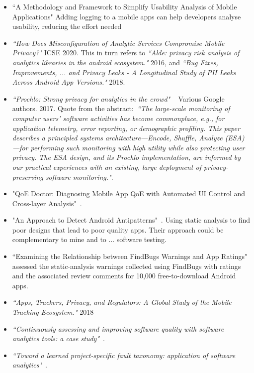 \begin{itemize}
    \item ``A Methodology and Framework to Simplify Usability Analysis of Mobile Applications" Adding logging to a mobile apps can help developers analyse usability, reducing the effort needed
    
    \item \emph{``How Does Misconfiguration of Analytic Services Compromise Mobile Privacy?"} ICSE 2020. This in turn refers to \emph{``Alde: privacy risk analysis of analytics libraries in the android ecosystem."} 2016, and \emph{``Bug Fixes, Improvements, ... and Privacy Leaks - A Longitudinal Study of PII Leaks Across Android App Versions."} 2018.
    
    \item \emph{``Prochlo: Strong privacy for analytics in the crowd"}  ~\citep{prochlo2017_strong_privacy_analytics_in_the_crowd_46411} Various Google authors. 2017. Quote from the abstract:~\emph{``The large-scale monitoring of computer users' software activities has become commonplace, e.g., for application telemetry, error reporting, or demographic profiling. This paper describes a principled systems architecture---Encode, Shuffle, Analyze (ESA)---for performing such monitoring with high utility while also protecting user privacy. The ESA design, and its Prochlo implementation, are informed by our practical experiences with an existing, large deployment of privacy-preserving software monitoring."}.

    \item "QoE Doctor: Diagnosing Mobile App QoE with Automated UI Control and Cross-layer Analysis"~\cite{chen2014qoe}.
    \item "An Approach to Detect Android Antipatterns"~\cite{hecht2015approach}. Using static analysis to find poor designs that lead to poor quality apps. Their approach could be complementary to mine and to ... software testing.
    \item ``Examining the Relationship between FindBugs Warnings and App Ratings"~\cite{khalid2016_examining_the_relationship_between_findbugs_warnings_and_app_ratings} assessed the static-analysis warnings collected using FindBugs with ratings and the associated review comments for 10,000 free-to-download Android apps.
    
    \item \emph{``Apps, Trackers, Privacy, and Regulators: A Global Study of the Mobile Tracking Ecosystem."} 2018
    
    \item \emph{``Continuously assessing and improving software quality with software analytics tools: a case study"}~\cite{martinez_fernandez2019_continuously_assessing_and_improving_software_quallty_with_software_analytics_tools}.
    
    \item \emph{``Toward a learned project-specific fault taxonomy: application of software analytics"}~\cite{kidwell2015_toward_fault_taxonomy_application_of_software_analytics}.
    
\end{itemize}

